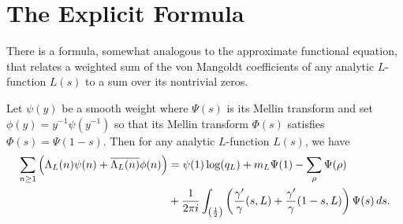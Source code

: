   \section{The Explicit Formula}
    There is a formula, somewhat analogous to the approximate functional equation, that relates a weighted sum of the von Mangoldt coefficients of any analytic \(L\)-function \(L(s)\) to a sum over its nontrivial zeros.

    \begin{theorem*}
      Let \(\psi(y)\) be a smooth weight where \(\Psi(s)\) is its Mellin transform and set \(\phi(y) = y^{-1}\psi(y^{-1})\) so that its Mellin transform \(\Phi(s)\) satisfies \(\Phi(s) = \Psi(1-s)\). Then for any analytic \(L\)-function \(L(s)\), we have
      \begin{align*}
        \sum_{n \ge 1}\left(\Lambda_{L}(n)\psi(n)+\overline{\Lambda_{L}(n)}\phi(n)\right) &= \psi(1)\log(q_{L})+m_{L}\Psi(1)-\sum_{\rho}\Psi(\rho) \\
        &+ \frac{1}{2\pi i}\int_{\left(\frac{1}{2}\right)}\left(\frac{\gamma'}{\gamma}(s,L)+\frac{\gamma'}{\gamma}(1-s,L)\right)\Psi(s)\,ds.
      \end{align*}
    \end{theorem*}
